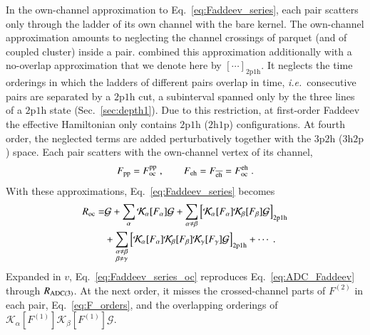 \documentclass[aip,jcp,reprint,noshowkeys,superscriptaddress]{revtex4-1}
\newcommand{\ie}{\textit{i.e.}}
\newcommand{\cK}{\mathcal{K}}
\newcommand{\hhp}{\text{2h1p}}
\newcommand{\pph}{\text{2p1h}}
\newcommand{\ppphh}{\text{3p2h}}
\newcommand{\hhhpp}{\text{3h2p}}
\newcommand{\eh}{\text{eh}}
\newcommand{\teh}{\overline{\text{eh}}}
\newcommand{\pp}{\text{pp}}
\begin{document}
In the own-channel approximation to Eq.~\eqref{eq:Faddeev_series},
each pair scatters only through the
ladder of its own channel with the bare kernel. 
The own-channel approximation amounts to 
neglecting the channel crossings of
parquet (and of coupled cluster) inside a pair.\cite{Barbieri2001}
\citet{Barbieri2001} combined this approximation additionally with
a no-overlap approximation that we denote here by 
$[\cdots]_{\pph}$. It neglects the time orderings in which the ladders of
different pairs overlap in time, \ie\ consecutive pairs are separated by
a $\pph$ cut, a subinterval spanned only by the three lines of a $\pph$
state (Sec.~\ref{sec:depth1}). 
Due to this restriction, at first-order Faddeev the effective
Hamiltonian only contains $\pph$ ($\hhp$) configurations.
At fourth order, the neglected terms are
added perturbatively together with the $\ppphh$
($\hhhpp$) space.
Each pair scatters with the own-channel vertex of its channel,
\begin{equation}
F_{\pp}=F^{\pp}_{\rm oc} \;,
\qquad
F_{\eh}=F_{\teh}=F^{\eh}_{\rm oc} \;.
\label{eq:F_alpha}
\end{equation}
With these approximations, Eq.~\eqref{eq:Faddeev_series} becomes 
\begin{equation}
\label{eq:Faddeev_series_oc}
\begin{aligned}
R_{\rm oc}
= &
\mathcal G+\sum_{\alpha}\cK_\alpha[F_\alpha]\mathcal G
+\sum_{\alpha\neq\beta}\Big[\cK_\alpha[F_\alpha]\cK_\beta[F_\beta]\mathcal G\Big]_{\pph}
\\
& +\sum_{\substack{\alpha\neq\beta\\\beta\neq\gamma}}
\Big[\cK_\alpha[F_\alpha]\cK_\beta[F_\beta]\cK_\gamma[F_\gamma]\mathcal G\Big]_{\pph}
+\cdots \;.
\end{aligned}
\end{equation}
Expanded in $v$, Eq.~\eqref{eq:Faddeev_series_oc} reproduces
Eq.~\eqref{eq:ADC_Faddeev} through $R_{\rm ADC(3)}$. At the next order,
it misses the crossed-channel parts of $F^{(2)}$ in each pair,
Eq.~\eqref{eq:F_orders}, and the overlapping orderings of
$\cK_\alpha[F^{(1)}]\cK_\beta[F^{(1)}]\mathcal G$.
\end{document}
